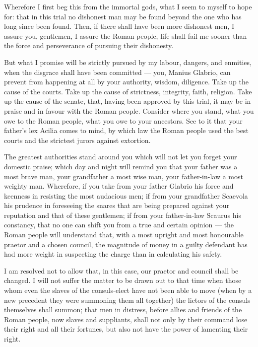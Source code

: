  Wherefore I first beg this from the immortal gods, what I seem to myself to hope for: that in this trial no dishonest man may be found beyond the one who has long since been found. Then, if there shall have been more dishonest men, I assure you, gentlemen, I assure the Roman people, life shall fail me sooner than the force and perseverance of pursuing their dishonesty.

 But what I promise will be strictly pursued by my labour, dangers, and enmities, when the disgrace shall have been committed --- you, Manius Glabrio, can prevent from happening at all by your authority, wisdom, diligence. Take up the cause of the courts. Take up the cause of strictness, integrity, faith, religion. Take up the cause of the senate, that, having been approved by this trial, it may be in praise and in favour with the Roman people. Consider where you stand, what you owe to the Roman people, what you owe to your ancestors. See to it that your father's lex Acilia comes to mind, by which law the Roman people used the best courts and the strictest jurors against extortion.

 The greatest authorities stand around you which will not let you forget your domestic praise; which day and night will remind you that your father was a most brave man, your grandfather a most wise man, your father-in-law a most weighty man. Wherefore, if you take from your father Glabrio his force and keenness in resisting the most audacious men; if from your grandfather Scaevola his prudence in foreseeing the snares that are being prepared against your reputation and that of these gentlemen; if from your father-in-law Scaurus his constancy, that no one can shift you from a true and certain opinion --- the Roman people will understand that, with a most upright and most honourable praetor and a chosen council, the magnitude of money in a guilty defendant has had more weight in suspecting the charge than in calculating his safety.

 I am resolved not to allow that, in this case, our praetor and council shall be changed. I will not suffer the matter to be drawn out to that time when those whom even the slaves of the consuls-elect have not been able to move (when by a new precedent they were summoning them all together) the lictors of the consuls themselves shall summon; that men in distress, before allies and friends of the Roman people, now slaves and suppliants, shall not only by their command lose their right and all their fortunes, but also not have the power of lamenting their right.

